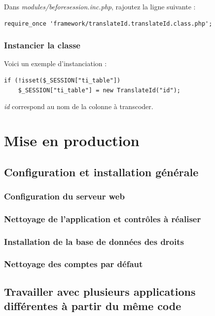 Dans \textit{modules/beforesession.inc.php}, rajoutez la ligne suivante :
\begin{lstlisting}
require_once 'framework/translateId.translateId.class.php';
\end{lstlisting}

\subsection{Instancier la classe}
Voici un exemple d'instanciation :
\begin{lstlisting}
if (!isset($_SESSION["ti_table"]) 
	$_SESSION["ti_table"] = new TranslateId("id");
\end{lstlisting}

\textit{id} correspond au nom de la colonne à transcoder.



\chapter{Mise en production}

\section{Configuration et installation générale}

\subsection{Configuration du serveur web}

\subsection{Nettoyage de l'application et contrôles à réaliser}

\subsection{Installation de la base de données des droits}

\subsection{Nettoyage des comptes par défaut}

\section{Travailler avec plusieurs applications différentes à partir du même code}\label{dnsmultiple}

